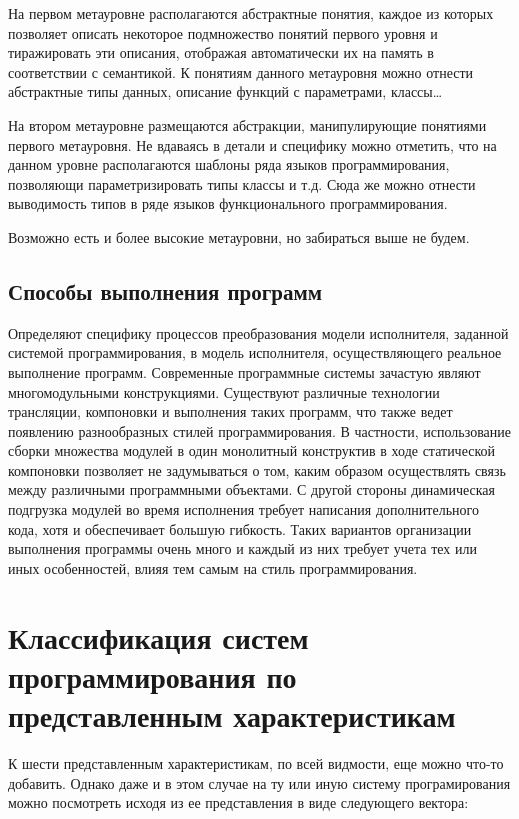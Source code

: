 На первом метауровне располагаются абстрактные понятия, каждое из которых позволяет описать некоторое подмножество понятий первого уровня и тиражировать эти описания, отображая автоматически их на память в соответствии с семантикой. К понятиям данного метауровня можно отнести абстрактные типы данных, описание функций с параметрами, классы…

На втором метауровне размещаются абстракции, манипулирующие понятиями первого метауровня. Не вдаваясь в детали и специфику можно отметить, что на данном уровне располагаются шаблоны ряда языков программирования, позволяющи параметризировать типы классы и т.д. Сюда же можно отнести выводимость типов в ряде языков функционального программирования.

Возможно есть и более высокие метауровни, но забираться выше не будем.


\subsection{Способы выполнения программ}

Определяют специфику процессов преобразования модели исполнителя, заданной системой программирования, в модель исполнителя, осуществляющего реальное выполнение программ. Современные программные системы зачастую являют многомодульными конструкциями. Существуют различные технологии трансляции, компоновки и выполнения таких программ, что также ведет появлению разнообразных стилей программирования. В частности, использование сборки множества модулей в один монолитный конструктив в ходе статической компоновки позволяет не задумываться о том, каким образом осуществлять связь между различными программными объектами. С другой стороны динамическая подгрузка модулей во время исполнения требует написания дополнительного кода, хотя и обеспечивает большую гибкость. Таких вариантов организации выполнения программы очень много и каждый из них требует учета тех или иных особенностей, влияя тем самым на стиль программирования.

\section{Классификация систем программирования по представленным характеристикам}

К шести представленным характеристикам, по всей видмости, еще можно что-то добавить. Однако даже и в этом случае на ту или иную систему програмирования можно посмотреть исходя из ее представления в виде следующего вектора:

